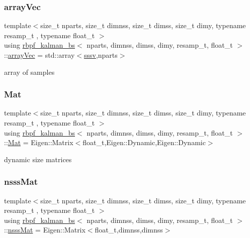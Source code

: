 \subsubsection{\texorpdfstring{array\+Vec}{arrayVec}}
{\footnotesize\ttfamily template$<$size\+\_\+t nparts, size\+\_\+t dimnss, size\+\_\+t dimss, size\+\_\+t dimy, typename resamp\+\_\+t , typename float\+\_\+t $>$ \\
using \hyperlink{classrbpf__kalman__bs}{rbpf\+\_\+kalman\+\_\+bs}$<$ nparts, dimnss, dimss, dimy, resamp\+\_\+t, float\+\_\+t $>$\+::\hyperlink{classrbpf__kalman__bs_ae4f4df4fb0cffea207901b0d358a519b}{array\+Vec} =  std\+::array$<$\hyperlink{classrbpf__kalman__bs_a2b40c9fa0d7a2ca42be3d0c43db0db8b}{sssv},nparts$>$}

array of samples \mbox{\label{classrbpf__kalman__bs_add5db33a27f25ec3e72ecd8e4c9ce755}} 
\subsubsection{\texorpdfstring{Mat}{Mat}}
{\footnotesize\ttfamily template$<$size\+\_\+t nparts, size\+\_\+t dimnss, size\+\_\+t dimss, size\+\_\+t dimy, typename resamp\+\_\+t , typename float\+\_\+t $>$ \\
using \hyperlink{classrbpf__kalman__bs}{rbpf\+\_\+kalman\+\_\+bs}$<$ nparts, dimnss, dimss, dimy, resamp\+\_\+t, float\+\_\+t $>$\+::\hyperlink{classrbpf__kalman__bs_add5db33a27f25ec3e72ecd8e4c9ce755}{Mat} =  Eigen\+::\+Matrix$<$float\+\_\+t,Eigen\+::\+Dynamic,Eigen\+::\+Dynamic$>$}

dynamic size matrices \mbox{\label{classrbpf__kalman__bs_a0d3dfd24b849c0bf33fa3df8ce56dd07}} 
\subsubsection{\texorpdfstring{nsss\+Mat}{nsssMat}}
{\footnotesize\ttfamily template$<$size\+\_\+t nparts, size\+\_\+t dimnss, size\+\_\+t dimss, size\+\_\+t dimy, typename resamp\+\_\+t , typename float\+\_\+t $>$ \\
using \hyperlink{classrbpf__kalman__bs}{rbpf\+\_\+kalman\+\_\+bs}$<$ nparts, dimnss, dimss, dimy, resamp\+\_\+t, float\+\_\+t $>$\+::\hyperlink{classrbpf__kalman__bs_a0d3dfd24b849c0bf33fa3df8ce56dd07}{nsss\+Mat} =  Eigen\+::\+Matrix$<$float\+\_\+t,dimnss,dimnss$>$}

